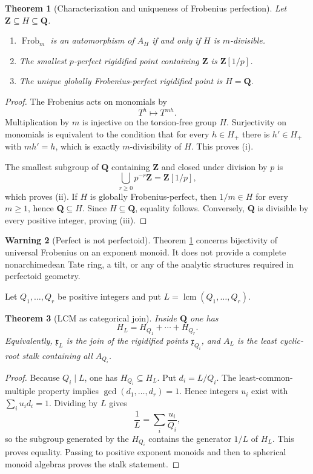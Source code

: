 \documentclass[11pt]{amsart}
\numberwithin{equation}{section}
\newtheorem{theorem}{Theorem}[section]
\theoremstyle{definition}
\newtheorem{warning}[theorem]{Warning}
\newcommand{\Z}{\mathbf Z}
\newcommand{\Q}{\mathbf Q}
\newcommand{\Frob}{\operatorname{Frob}}
\begin{document}
\begin{theorem}[Characterization and uniqueness of Frobenius perfection]
\label{thm:unique-frobenius-perfect-point}
Let $\Z\subseteq H\subseteq\Q$.
\begin{enumerate}[label=\textup{(\roman*)}]
\item $\Frob_m$ is an automorphism of $A_H$ if and only if $H$ is
$m$-divisible.
\item The smallest $p$-perfect rigidified point containing $\Z$ is
$\Z[1/p]$.
\item The unique globally Frobenius-perfect rigidified point is $H=\Q$.
\end{enumerate}
\end{theorem}

\begin{proof}
The Frobenius acts on monomials by
\[
T^h\longmapsto T^{mh}.
\]
Multiplication by $m$ is injective on the torsion-free group $H$.
Surjectivity on monomials is equivalent to the condition that for every
$h\in H_+$ there is $h'\in H_+$ with $mh'=h$, which is exactly
$m$-divisibility of $H$.  This proves (i).

The smallest subgroup of $\Q$ containing $\Z$ and closed under division
by $p$ is
\[
\bigcup_{r\geq0}p^{-r}\Z=\Z[1/p],
\]
which proves (ii).  If $H$ is globally Frobenius-perfect, then
$1/m\in H$ for every $m\geq1$, hence $\Q\subseteq H$.  Since
$H\subseteq\Q$, equality follows.  Conversely, $\Q$ is divisible by every
positive integer, proving (iii).
\end{proof}

\begin{warning}[Perfect is not perfectoid]
Theorem \ref{thm:unique-frobenius-perfect-point} concerns bijectivity of
universal Frobenius on an exponent monoid.  It does not provide a complete
nonarchimedean Tate ring, a tilt, or any of the analytic structures required
in perfectoid geometry.
\end{warning}

Let $Q_1,\dots,Q_r$ be positive integers and put
$L=\operatorname{lcm}(Q_1,\dots,Q_r)$.

\begin{theorem}[LCM as categorical join]
\label{thm:lcm-join}
Inside $\Q$ one has
\[
H_L=H_{Q_1}+\cdots+H_{Q_r}.
\]
Equivalently, $\mathfrak x_L$ is the join of the rigidified points
$\mathfrak x_{Q_i}$, and $A_L$ is the least cyclic-root stalk containing
all $A_{Q_i}$.
\end{theorem}

\begin{proof}
Because $Q_i\mid L$, one has $H_{Q_i}\subseteq H_L$.  Put $d_i=L/Q_i$.
The least-common-multiple property implies
$\gcd(d_1,\dots,d_r)=1$.  Hence integers $u_i$ exist with
$\sum_i u_id_i=1$.  Dividing by $L$ gives
\[
\frac1L=\sum_i\frac{u_i}{Q_i},
\]
so the subgroup generated by the $H_{Q_i}$ contains the generator $1/L$
of $H_L$.  This proves equality.  Passing to positive exponent monoids and
then to spherical monoid algebras proves the stalk statement.
\end{proof}
\end{document}
